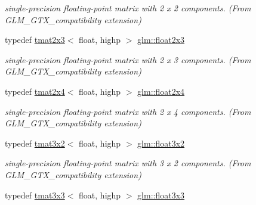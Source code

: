 \begin{DoxyCompactItemize}
\begin{DoxyCompactList}\small\item\em single-\/precision floating-\/point matrix with 2 x 2 components. (From G\+L\+M\+\_\+\+G\+T\+X\+\_\+compatibility extension) \end{DoxyCompactList}\item 
\mbox{\label{group__gtx__compatibility_gad4078adf5ec44d1878c63bf2962fbe9e}} 
typedef \hyperlink{structglm_1_1tmat2x3}{tmat2x3}$<$ float, highp $>$ \hyperlink{group__gtx__compatibility_gad4078adf5ec44d1878c63bf2962fbe9e}{glm\+::float2x3}
\begin{DoxyCompactList}\small\item\em single-\/precision floating-\/point matrix with 2 x 3 components. (From G\+L\+M\+\_\+\+G\+T\+X\+\_\+compatibility extension) \end{DoxyCompactList}\item 
\mbox{\label{group__gtx__compatibility_ga33955674c7eee16728dd45fc10dc9547}} 
typedef \hyperlink{structglm_1_1tmat2x4}{tmat2x4}$<$ float, highp $>$ \hyperlink{group__gtx__compatibility_ga33955674c7eee16728dd45fc10dc9547}{glm\+::float2x4}
\begin{DoxyCompactList}\small\item\em single-\/precision floating-\/point matrix with 2 x 4 components. (From G\+L\+M\+\_\+\+G\+T\+X\+\_\+compatibility extension) \end{DoxyCompactList}\item 
\mbox{\label{group__gtx__compatibility_ga2d2b535c9bad9274456ae12676bc6865}} 
typedef \hyperlink{structglm_1_1tmat3x2}{tmat3x2}$<$ float, highp $>$ \hyperlink{group__gtx__compatibility_ga2d2b535c9bad9274456ae12676bc6865}{glm\+::float3x2}
\begin{DoxyCompactList}\small\item\em single-\/precision floating-\/point matrix with 3 x 2 components. (From G\+L\+M\+\_\+\+G\+T\+X\+\_\+compatibility extension) \end{DoxyCompactList}\item 
\mbox{\label{group__gtx__compatibility_ga75c991509a4c4894f10ab480f89e39e7}} 
typedef \hyperlink{structglm_1_1tmat3x3}{tmat3x3}$<$ float, highp $>$ \hyperlink{group__gtx__compatibility_ga75c991509a4c4894f10ab480f89e39e7}{glm\+::float3x3}

\end{DoxyCompactItemize}
